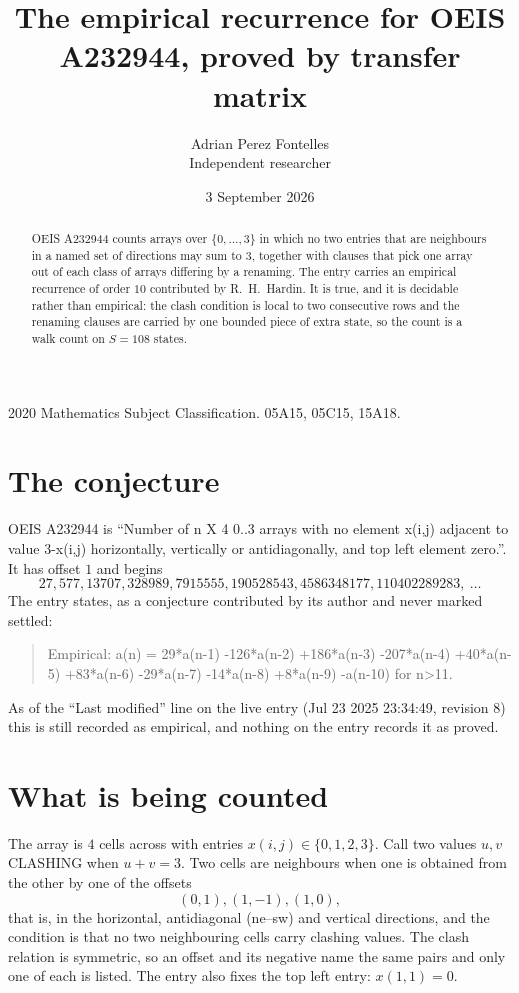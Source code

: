 \documentclass[11pt,a4paper]{article}
\title{The empirical recurrence for OEIS A232944, proved by transfer matrix}
\author{Adrian Perez Fontelles\\ \small Independent researcher}
\date{3 September 2026}
\theoremstyle{plain}
\theoremstyle{definition}
\begin{document}
\maketitle

\begin{abstract}
OEIS A232944 counts arrays over $\{0,\dots,3\}$ in which no two entries that are neighbours in
a named set of directions may sum to $3$, together with clauses that pick one array out of
each class of arrays differing by a renaming. The entry carries an empirical recurrence of
order $10$ contributed by R.~H.~Hardin. It is true, and it is decidable rather than
empirical: the clash condition is local to two consecutive rows and the renaming clauses are
carried by one bounded piece of extra state, so the count is a walk count on $S=108$ states.
\end{abstract}

\noindent\small 2020 Mathematics Subject Classification. 05A15, 05C15, 15A18.\normalsize

\section{The conjecture}

OEIS A232944 is ``Number of n X 4 0..3 arrays with no element x(i,j) adjacent to value 3-x(i,j) horizontally, vertically or antidiagonally, and top left element zero.''. It has offset $1$ and begins
\[
27, 577, 13707, 328989, 7915555, 190528543, 4586348177, 110402289283,\ \dots
\]
The entry states, as a conjecture contributed by its author and never marked settled:
\begin{quote}
Empirical: a(n) = 29*a(n-1) -126*a(n-2) +186*a(n-3) -207*a(n-4) +40*a(n-5) +83*a(n-6) -29*a(n-7) -14*a(n-8) +8*a(n-9) -a(n-10) for n>11.
\end{quote}
As of the ``Last modified'' line on the live entry (Jul 23 2025 23:34:49, revision 8) this is still
recorded as empirical, and nothing on the entry records it as proved.

\section{What is being counted}

The array is $4$ cells across with entries $x(i,j)\in\{0,1,2,3\}$. Call two values $u,v$ CLASHING
when $u+v=3$. Two cells are neighbours when one is obtained from the other by one of
the offsets
\[
(0,1), (1,-1), (1,0),
\]
that is, in the horizontal, antidiagonal (ne--sw) and vertical directions, and the condition is that no two neighbouring cells carry
clashing values. The clash relation is symmetric, so an offset and its negative name the
same pairs and only one of each is listed. The entry also fixes the top left entry: $x(1,1)=0$.
\end{document}
